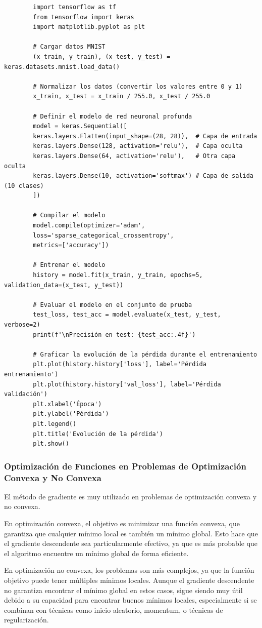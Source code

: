 \documentclass{article}
\begin{document}
	\begin{verbatim}
		import tensorflow as tf
		from tensorflow import keras
		import matplotlib.pyplot as plt
		
		# Cargar datos MNIST
		(x_train, y_train), (x_test, y_test) = keras.datasets.mnist.load_data()
		
		# Normalizar los datos (convertir los valores entre 0 y 1)
		x_train, x_test = x_train / 255.0, x_test / 255.0
		
		# Definir el modelo de red neuronal profunda
		model = keras.Sequential([
		keras.layers.Flatten(input_shape=(28, 28)),  # Capa de entrada
		keras.layers.Dense(128, activation='relu'),  # Capa oculta
		keras.layers.Dense(64, activation='relu'),   # Otra capa oculta
		keras.layers.Dense(10, activation='softmax') # Capa de salida (10 clases)
		])
		
		# Compilar el modelo
		model.compile(optimizer='adam',
		loss='sparse_categorical_crossentropy',
		metrics=['accuracy'])
		
		# Entrenar el modelo
		history = model.fit(x_train, y_train, epochs=5, validation_data=(x_test, y_test))
		
		# Evaluar el modelo en el conjunto de prueba
		test_loss, test_acc = model.evaluate(x_test, y_test, verbose=2)
		print(f'\nPrecisión en test: {test_acc:.4f}')
		
		# Graficar la evolución de la pérdida durante el entrenamiento
		plt.plot(history.history['loss'], label='Pérdida entrenamiento')
		plt.plot(history.history['val_loss'], label='Pérdida validación')
		plt.xlabel('Época')
		plt.ylabel('Pérdida')
		plt.legend()
		plt.title('Evolución de la pérdida')
		plt.show()
	\end{verbatim}
	
	\subsubsection{Optimización de Funciones en Problemas de Optimización Convexa y No Convexa}
	
	El método de gradiente es muy utilizado en problemas de optimización convexa y no convexa.
	
	En optimización convexa, el objetivo es minimizar una función convexa, que garantiza que cualquier mínimo local es también un mínimo global. Esto hace que el gradiente descendente sea particularmente efectivo, ya que es más probable que el algoritmo encuentre un mínimo global de forma eficiente.
	
	En optimización no convexa, los problemas son más complejos, ya que la función objetivo puede tener múltiples mínimos locales. Aunque el gradiente descendente no garantiza encontrar el mínimo global en estos casos, sigue siendo muy útil debido a su capacidad para encontrar buenos mínimos locales, especialmente si se combinan con técnicas como inicio aleatorio, momentum, o técnicas de regularización.
	
\end{document}
